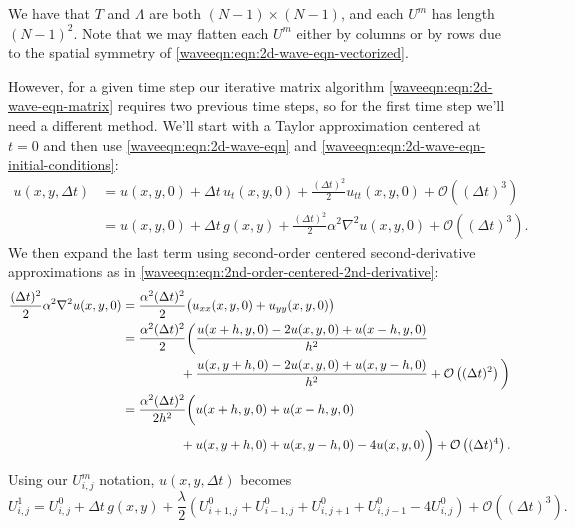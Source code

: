We have that $T$ and $\Lambda$ are both $(N-1) \times (N-1)$, and each $U^m$ has length $(N-1)^2$.
Note that we may flatten each $U^m$ either by columns or by rows due to the spatial symmetry of \eqref{waveeqn:eqn:2d-wave-eqn-vectorized}.

However, for a given time step our iterative matrix algorithm \eqref{waveeqn:eqn:2d-wave-eqn-matrix} requires two previous time steps, so for the first time step we'll need a different method.
We'll start with a Taylor approximation centered at $t = 0$ and then use \eqref{waveeqn:eqn:2d-wave-eqn} and \eqref{waveeqn:eqn:2d-wave-eqn-initial-conditions}:
\begin{align*}
	u(x, y, \Delta t) &= u(x, y, 0) + \Delta t \, u_t(x, y, 0) + \frac{(\Delta t)^2} 2 u_{tt}(x, y, 0) + \mathcal O\left((\Delta t)^3\right) \\
	&= u(x, y, 0)
		+ \Delta t \, g(x, y)
		+ \frac{(\Delta t)^2}2 \alpha^2 \nabla^2 u(x, y, 0)
		+ \mathcal O\left((\Delta t)^3\right).
\end{align*}
We then expand the last term using second-order centered second-derivative approximations as in \eqref{waveeqn:eqn:2nd-order-centered-2nd-derivative}:
\begin{align*}
	\frac{(\Delta t)^2}2 \alpha^2 \nabla^2 u(x, y, 0)
	&= \frac{\alpha^2 (\Delta t)^2}2 \big(
		u_{xx}(x, y, 0) + u_{yy}(x, y, 0)
		\big) \\
	&= \frac{\alpha^2 (\Delta t)^2}2 \bigg(
			\frac{u(x + h, y, 0) - 2 u(x, y, 0) + u(x - h, y, 0)}{h^2} \\
			& \hphantom{{}={} \frac{\alpha^2 (\Delta t)^2}2 \bigg(}
			\mathllap{{}+{}} \frac{u(x, y + h, 0) - 2 u(x, y, 0) + u(x, y - h, 0)}{h^2}
			+ \mathcal O\left((\Delta t)^2\right) \bigg) \\
	&= \frac{\alpha^2 (\Delta t)^2}{2 h^2} \bigg(
			u(x + h, y, 0) + u(x - h, y, 0) \\
			& \hphantom{{}={} \frac{\alpha^2 (\Delta t)^2}{2 h^2} \bigg(}
			\mathllap{{}+{}} u(x, y + h, 0) + u(x, y - h, 0)
			- 4 u(x, y, 0)
		\bigg) + \mathcal O\left((\Delta t)^4\right).
\end{align*}
Using our $U_{i, j}^m$ notation, $u(x, y, \Delta t)$ becomes
\begin{equation*}
	U_{i, j}^1 = U_{i, j}^0 + \Delta t \, g(x, y)
		+ \frac{\lambda}{2} \left(
			U_{i+1, j}^0 + U_{i-1, j}^0 + U_{i, j+1}^0 + U_{i, j-1}^0 - 4 U_{i, j}^0
	\right) + \mathcal O\left((\Delta t)^3\right).
\end{equation*}

